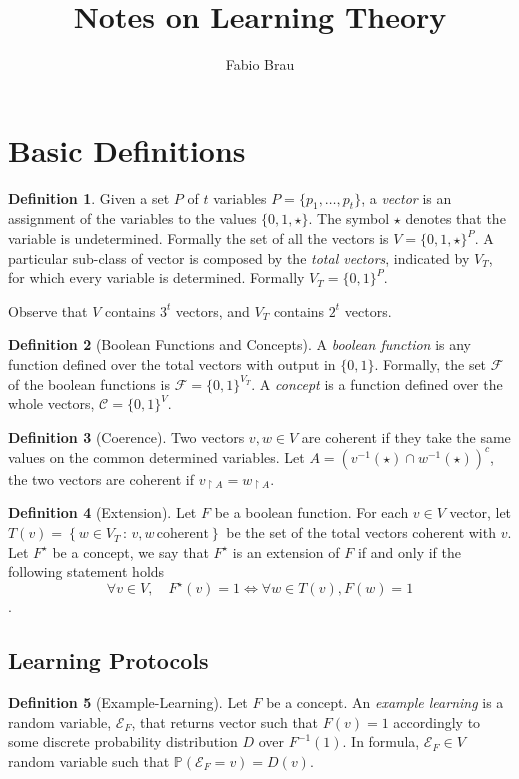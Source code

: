 \documentclass[a4paper,11pt]{article}
\author{Fabio Brau}
\title{Notes on Learning Theory}
\theoremstyle{definition}
\newtheorem{defn}{Definition}
\newcommand{\CC}{\mathcal{C}}
\begin{document}
\maketitle
\tableofcontents
\section{Basic Definitions}
\begin{defn}
  Given a set $P$ of $t$ variables $P=\{p_1,\dots,p_t\}$, a \textit{vector} 
  is an assignment of the variables to the values $\{0,1,\star\}$. The
  symbol $\star$ denotes that the variable is undetermined. Formally the set 
  of all the vectors is $V=\{0,1,\star\}^P$. A particular sub-class of vector 
  is composed by the \textit{total vectors}, indicated by $V_T$, for which every variable is
  determined. Formally $V_T = \{0,1\}^P$.
\end{defn}

Observe that $V$ contains $3^t$ vectors, and $V_T$ contains $2^t$ vectors.

\begin{defn}[Boolean Functions and Concepts]
  A \textit{boolean function} is any function defined over the total vectors
  with output in $\{0,1\}$. Formally, the set $\mathcal{F}$ of the boolean
  functions is $\mathcal{F}=\{0,1\}^{V_T}$. A \textit{concept} is a function
  defined over the whole vectors, $\CC=\{0,1\}^{V}$.
\end{defn}

\begin{defn}[Coerence]
  Two vectors $v,w\in V$ are coherent if they take the same values on the
  common determined variables. Let 
  $A = (v^{-1}(\star)\cap w^{-1}(\star))^c$, the two vectors are
  coherent if $v_{\restriction A} = w_{\restriction A}$.
\end{defn}

\begin{defn}[Extension]
  Let $F$ be a boolean function. For each $v\in V$ vector, let $T(v)=\left\{
  w\in V_T\,:\, v,w \, \mbox{coherent} \right\}$ be the set of the total vectors
  coherent with $v$. Let $F^\star$ be a concept, we say that $F^\star$ is an
  extension of $F$ if and
  only if the following statement holds 
  \begin{equation}
    \forall v\in V,\quad F^\star(v) = 1 \iff\forall w\in T(v), F(w)=1
    \label{extension}
  \end{equation}.
\end{defn}

\subsection{Learning Protocols}
\begin{defn}[Example-Learning]
  Let $F$ be a concept. An \textit{example learning} is a random variable, $\mathcal{E}_F$, 
  that returns vector such that $F(v)=1$ accordingly to some discrete
  probability distribution $D$ over $F^{-1}(1)$. In formula, $\mathcal{E}_F \in V$
  random variable such that $\mathbb{P}(\mathcal{E}_F=v)=D(v)$.
\end{defn}
\end{document}

